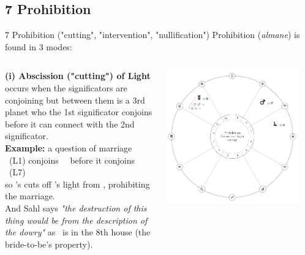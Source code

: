 \subsection{7 Prohibition}
\begin{frame}[t]{7 Prohibition ("cutting", "intervention", "nullification")}
Prohibition (\textsl{almane}) is found in 3 modes:\footnotemark[1]  \\
\begin{columns}[T, onlytextwidth]
\vspace{0.25cm}
\textbf{(i) Abscission ("cutting") of Light} \\
occurs when the significators are conjoining but between them is a 3rd planet who the 1st significator conjoins before it can connect with the 2nd significator. \\

\vspace{0.25cm}
\textbf{Example:} a question of marriage \\
\ul
\Mercury\ (L1) conjoins \Square\ \Mars\ before it conjoins \Trine\ \Jupiter (L7) \\
so \Mars's cuts off \Mercury's light from \Jupiter, prohibiting the marriage. \\

\vspace{0.15cm}
And Sahl says \textsl{"the destruction of this thing would be from the description of the dowry"} as \Mars\ is in the 8th house (the bride-to-be's property).

	
\vspace{-0.5cm}
\begin{center}
{\includegraphics[width=0.9\textwidth]{charts/62-abscission}} \\
\end{center}
\end{columns}
\end{frame}
